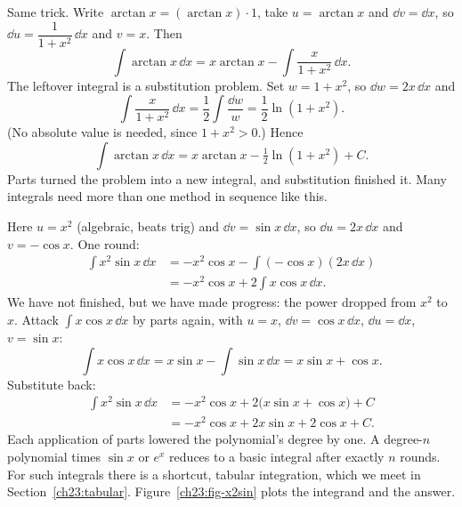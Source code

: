 \begin{example}
\label{ch23:ex-arctan}
Same trick. Write $\arctan x = (\arctan x)\cdot 1$, take $u=\arctan x$ and
$\dd v = \dd x$, so $\dd u = \dfrac{1}{1+x^2}\,\dd x$ and $v=x$. Then
\[
\int \arctan x\,\dd x = x\arctan x - \int \frac{x}{1+x^2}\,\dd x.
\]
The leftover integral is a substitution problem. Set $w = 1+x^2$, so
$\dd w = 2x\,\dd x$ and
\[
\int \frac{x}{1+x^2}\,\dd x = \frac12\int\frac{\dd w}{w} = \frac12\ln(1+x^2).
\]
(No absolute value is needed, since $1+x^2>0$.) Hence
\[
\int \arctan x\,\dd x = x\arctan x - \tfrac12\ln(1+x^2) + C.
\]
Parts turned the problem into a new integral, and substitution finished it.
Many integrals need more than one method in sequence like this.
\end{example}

\begin{example}
\label{ch23:ex-x2sin}
Here $u=x^2$ (algebraic, beats trig) and $\dd v = \sin x\,\dd x$, so
$\dd u = 2x\,\dd x$ and $v = -\cos x$. One round:
\begin{align*}
\int x^2\sin x\,\dd x &= -x^2\cos x - \int(-\cos x)(2x\,\dd x)\\
&= -x^2\cos x + 2\int x\cos x\,\dd x.
\end{align*}
We have not finished, but we have made progress: the power dropped from $x^2$ to
$x$. Attack $\int x\cos x\,\dd x$ by parts again, with $u=x$,
$\dd v = \cos x\,\dd x$, $\dd u = \dd x$, $v = \sin x$:
\[
\int x\cos x\,\dd x = x\sin x - \int \sin x\,\dd x = x\sin x + \cos x.
\]
Substitute back:
\begin{align*}
\int x^2\sin x\,\dd x &= -x^2\cos x + 2\big(x\sin x + \cos x\big) + C\\
&= -x^2\cos x + 2x\sin x + 2\cos x + C.
\end{align*}
Each application of parts lowered the polynomial's degree by one. A degree-$n$
polynomial times $\sin x$ or $e^x$ reduces to a basic integral after exactly $n$
rounds. For such integrals there is a shortcut, tabular integration, which we
meet in Section~\ref{ch23:tabular}. Figure~\ref{ch23:fig-x2sin} plots the
integrand and the answer.
\end{example}

